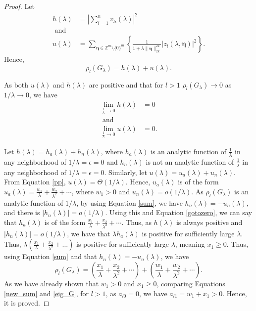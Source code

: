 \documentclass[10pt,a4paper]{amsart}
\begin{document}
\begin{proof}
Let \begin{equation}
    \begin{aligned}
        h(\lambda) &= \left|\sum\limits_{i=1}^nv_{li}(\lambda)\right|^2\\\mbox{  and }\\
        u(\lambda) &= \sum_{\boldsymbol{\eta}\in\mathbb{Z}^m\setminus\{0\}^m}\left\{ \frac{1}{1+\lambda\|\boldsymbol{\eta}\|_{2k}^{2k}}\left|z_l(\lambda,\boldsymbol{\eta})\right|^2 \right\}.
        \end{aligned}
\end{equation}
Hence, \begin{equation}\label{sum}
   \rho_l(G_{\lambda}) = h(\lambda) + u(\lambda).
\end{equation}

As both $u(\lambda)$ and $h(\lambda)$ are positive and that for $l>1$ $\rho_l(G_{\lambda}) \to 0$ as $1/\lambda\to 0$, we have \begin{equation}\label{gotozero}
    \begin{aligned}
        \lim\limits_{\frac{1}{\lambda}\to0}h(\lambda) &= 0\\  \mbox{  and  }\\
        \lim\limits_{\frac{1}{\lambda}\to0}u(\lambda) &= 0.
    \end{aligned}
\end{equation}

Let $h(\lambda) = h_a(\lambda) + h_n(\lambda)$, where $h_a(\lambda)$ is an analytic function of $\frac{1}{\lambda}$ in any neighborhood of $1/\lambda =\epsilon = 0$ and $h_n(\lambda)$ is not an analytic function of $\frac{1}{\lambda}$ in any neighborhood of $1/\lambda =\epsilon = 0$. Similarly, let $u(\lambda) = u_a(\lambda) + u_n(\lambda)$. From Equation \ref{pp}, $u(\lambda) = \Theta(1/\lambda)$. Hence, $u_a(\lambda)$ is of the form $u_a(\lambda) = \frac{w_1}{\lambda}+\frac{w_2}{\lambda^2}+\cdots$, where $w_1>0$ and $u_n(\lambda) = o(1/\lambda)$. As $\rho_l(G_{\lambda})$ is an analytic function of $1/\lambda$, by using Equation \ref{sum}, we have $h_n(\lambda) = - u_n(\lambda)$, and there is $\left|h_n(\lambda)\right| = o(1/\lambda)$. Using this and Equation \ref{gotozero}, we can say that $h_a(\lambda)$ is of the form $\frac{x_1}{\lambda}+\frac{x_2}{\lambda^2}+\cdots$. Thus, as $h(\lambda)$ is always positive and $|h_n(\lambda)| = o(1/\lambda)$, we have that $\lambda h_a(\lambda)$ is positive for sufficiently large $\lambda$. Thus, $\lambda(\frac{x_1}{\lambda}+\frac{x_2}{\lambda^2}+\ldots)$ is positive for sufficiently large $\lambda$, meaning $x_1\ge 0$. Thus, using Equation \ref{sum} and that $h_n(\lambda) = -u_n(\lambda)$, we have \begin{equation}\label{new_sum}
    \rho_l(G_{\lambda}) = \left(\frac{x_1}{\lambda}+\frac{x_2}{\lambda^2}+\cdots\right) + \left(\frac{w_1}{\lambda}+\frac{w_2}{\lambda^2}+\cdots\right).
\end{equation} As we have already shown that $w_1>0$ and $x_1\ge 0$, comparing Equations \ref{new_sum} and \ref{eig_G}, for $l>1$, as $a_{l0} = 0$, we have $a_{l1} = w_1+x_1 > 0$. Hence, it is proved.



\end{proof}
\end{document}
